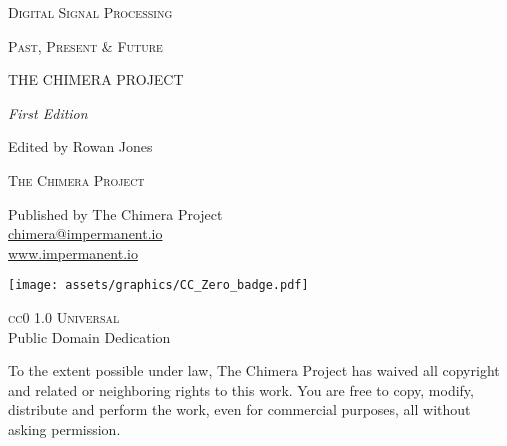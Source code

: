 \newpage
\thispagestyle{empty}
\vspace*{4cm}
\begin{center}

{\fontsize{11}{13}\selectfont\textsc{Digital Signal Processing}}

\vspace{0.3cm}

{\fontsize{11}{13}\selectfont\textsc{Past, Present \& Future}}

\vspace{2.5cm}

{\trajantitle\fontsize{36}{42}\selectfont THE CHIMERA PROJECT}

\vspace{2cm}

{\Large\textit{First Edition}}

\vspace{0.5cm}

{\large Edited by Rowan Jones}

\vspace*{\fill}

\end{center}
\newpage

\newpage
\thispagestyle{empty}
\vspace*{\fill}
\begin{center}

{\large\textsc{The Chimera Project}}

\vspace{1.5cm}

Published by The Chimera Project\\
\href{mailto:chimera@impermanent.io}{chimera@impermanent.io}\\
\url{www.impermanent.io}

\vspace{2cm}

\texttt{[image: assets/graphics/CC\_Zero\_badge.pdf]}

\vspace{0.8cm}

{\large\textsc{cc0 1.0 Universal}}\\
\vspace{0.3cm}
{\normalsize Public Domain Dedication}

\vspace{1.5cm}

\begin{minipage}{0.75\textwidth}
\centering
{\small To the extent possible under law, The Chimera Project has waived all copyright and related or neighboring rights to this work. You are free to copy, modify, distribute and perform the work, even for commercial purposes, all without asking permission.}
\end{minipage}

\end{center}
\vspace*{\fill}
\newpage